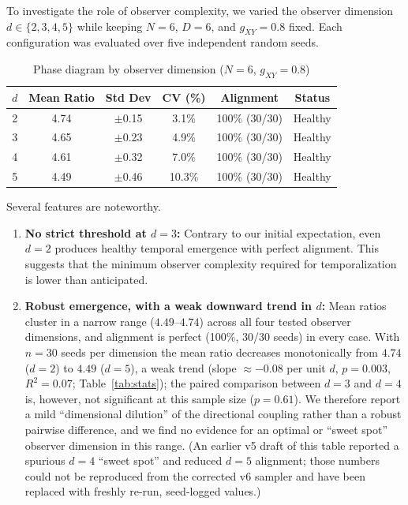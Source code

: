 \documentclass[12pt,a4paper]{article}
\begin{document}
To investigate the role of observer complexity, we varied the observer
dimension $d \in \{2,3,4,5\}$ while keeping $N=6$, $D=6$, and
$g_{XY}=0.8$ fixed. Each configuration was evaluated over five independent
random seeds.

\begin{table}[ht]
\centering
\caption{Phase diagram by observer dimension ($N=6$, $g_{XY}=0.8$)}
\label{tab:phase_diagram}
\begin{tabular}{cccccc}
\toprule
$d$ & Mean Ratio & Std Dev & CV (\%) & Alignment & Status \\
\midrule
2 & 4.74 & $\pm$0.15 & 3.1\% & 100\% (30/30) & Healthy \\
3 & 4.65 & $\pm$0.23 & 4.9\% & 100\% (30/30) & Healthy \\
4 & 4.61 & $\pm$0.32 & 7.0\% & 100\% (30/30) & Healthy \\
5 & 4.49 & $\pm$0.46 & 10.3\% & 100\% (30/30) & Healthy \\
\bottomrule
\end{tabular}
\end{table}

Several features are noteworthy.

\begin{enumerate}[leftmargin=*]
\item \textbf{No strict threshold at $d=3$:}
Contrary to our initial expectation, even $d=2$ produces healthy temporal
emergence with perfect alignment. This suggests that the minimum observer
complexity required for temporalization is lower than anticipated.

\item \textbf{Robust emergence, with a weak downward trend in $d$:}
Mean ratios cluster in a narrow range ($4.49$--$4.74$) across all four tested
observer dimensions, and alignment is perfect (100\%, 30/30 seeds) in every
case. With $n=30$ seeds per dimension the mean ratio decreases monotonically
from $4.74$ ($d=2$) to $4.49$ ($d=5$), a weak trend (slope $\approx -0.08$
per unit $d$, $p=0.003$, $R^2=0.07$; Table~\ref{tab:stats}); the paired
comparison between $d=3$ and $d=4$ is, however, not significant at this
sample size ($p=0.61$). We therefore report a mild ``dimensional dilution''
of the directional coupling rather than a robust pairwise difference, and we
find no evidence for an optimal or ``sweet spot'' observer dimension in this
range. (An earlier v5 draft of this table reported a spurious $d=4$ ``sweet
spot'' and reduced $d=5$ alignment; those numbers could not be reproduced
from the corrected v6 sampler and have been replaced with freshly re-run,
seed-logged values.)
\end{enumerate}
\end{document}
